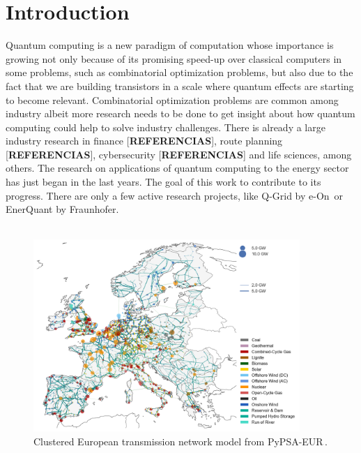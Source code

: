
\chapter{Introduction} %

\label{Chapter1} %

%
%
Quantum computing is a new paradigm of computation whose importance is growing not only because of its promising speed-up over classical computers in some problems, such as combinatorial optimization problems, but also due to the fact that we are building transistors in a scale where quantum effects are starting to become relevant. Combinatorial optimization problems are common among industry albeit more research needs to be done to get insight about how quantum computing could help to solve industry challenges. There is already a large industry research in finance [\textbf{REFERENCIAS}], route planning [\textbf{REFERENCIAS}], cybersecurity [\textbf{REFERENCIAS}] and life sciences, among others. The research on applications of quantum computing to the energy sector has just began in the last years. The goal of this work to contribute to its progress. There are only a few active research projects, like Q-Grid by e-On\,\cite{Fernandez-Campoamor2021CommunityAnnealing} or EnerQuant by Fraunhofer.\\\\
\begin{figure}[H]
  \begin{center}
\includegraphics[width=0.9\textwidth]{Figures/Europe-Grid.png}
  \end{center}
  \caption{Clustered European transmission network model from PyPSA-EUR\,\cite{PyPSA-Eur:PyPSA-Eur}. }
\end{figure}
